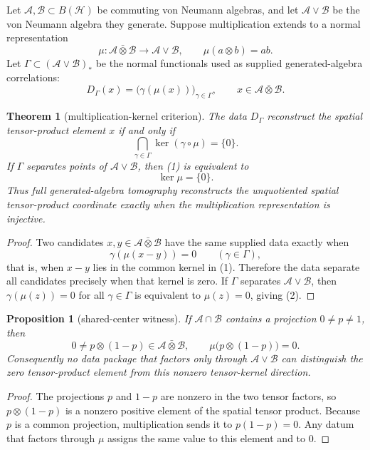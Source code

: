 \documentclass[12pt]{article}
\newtheorem{theorem}{Theorem}
\newtheorem{proposition}{Proposition}
\theoremstyle{remark}
\newcommand{\A}{\mathcal A}
\newcommand{\B}{\mathcal B}
\newcommand{\Hcal}{\mathcal H}
\newcommand{\barotimes}{\mathbin{\bar\otimes}}
\begin{document}
Let \(\A,\B\subset B(\Hcal)\) be commuting von Neumann algebras, and let
\(\A\vee\B\) be the von Neumann algebra they generate.  Suppose multiplication
extends to a normal representation
\[
  \mu:\A\barotimes\B\longrightarrow \A\vee\B,
  \qquad
  \mu(a\otimes b)=ab .
\]
Let \(\Gamma\subset(\A\vee\B)_*\) be the normal functionals used as supplied
generated-algebra correlations:
\[
  D_\Gamma(x)=\bigl(\gamma(\mu(x))\bigr)_{\gamma\in\Gamma},
  \qquad x\in\A\barotimes\B .
\]

\begin{theorem}[multiplication-kernel criterion]
\label{thm:multiplication-kernel}
The data \(D_\Gamma\) reconstruct the spatial tensor-product element \(x\)
if and only if
\[
  \bigcap_{\gamma\in\Gamma}\ker(\gamma\circ\mu)=\{0\}.
  \tag{1}
\]
If \(\Gamma\) separates points of \(\A\vee\B\), then (1) is equivalent to
\[
  \ker\mu=\{0\}.
  \tag{2}
\]
Thus full generated-algebra tomography reconstructs the unquotiented spatial
tensor-product coordinate exactly when the multiplication representation is
injective.
\end{theorem}

\begin{proof}
Two candidates \(x,y\in\A\barotimes\B\) have the same supplied data exactly
when
\[
  \gamma(\mu(x-y))=0\qquad(\gamma\in\Gamma),
\]
that is, when \(x-y\) lies in the common kernel in (1).  Therefore the data
separate all candidates precisely when that kernel is zero.  If \(\Gamma\)
separates \(\A\vee\B\), then \(\gamma(\mu(z))=0\) for all \(\gamma\in\Gamma\)
is equivalent to \(\mu(z)=0\), giving (2).
\end{proof}

\begin{proposition}[shared-center witness]
\label{prop:shared-center}
If \(\A\cap\B\) contains a projection \(0\ne p\ne1\), then
\[
  0\ne p\otimes(1-p)\in\A\barotimes\B,
  \qquad
  \mu\bigl(p\otimes(1-p)\bigr)=0 .
\]
Consequently no data package that factors only through \(\A\vee\B\) can
distinguish the zero tensor-product element from this nonzero tensor-kernel
direction.
\end{proposition}

\begin{proof}
The projections \(p\) and \(1-p\) are nonzero in the two tensor factors, so
\(p\otimes(1-p)\) is a nonzero positive element of the spatial tensor product.
Because \(p\) is a common projection, multiplication sends it to
\(p(1-p)=0\).  Any datum that factors through \(\mu\) assigns the same value to
this element and to \(0\).
\end{proof}
\end{document}
